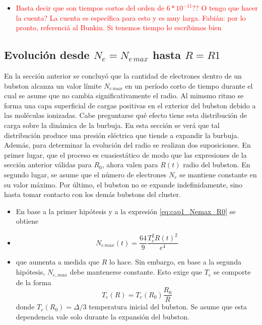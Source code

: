 \documentclass[aps,prb,twocolumn,superscriptaddress,floatfix,longbibliography,10pt]{revtex4-2}
\newif\ifptitle
\newif\ifpnumber
\newcounter{para}
\newcommand\ptitle[1]{\par\refstepcounter{para}
{\ifpnumber{\noindent\textcolor{lightgray}{\textbf{\thepara}}\indent}\fi}
{\ifptitle{\textbf{[{#1}]}}\fi}}
\begin{document}
\ptitle{Cálculo del tiempo al que se alcanza la densidad media máxima $t_0$??}
\begin{itemize}
  \item \textcolor{red}{Basta decir que son tiempos cortos del orden de $6*10^{-11}$?? O tengo que hacer la cuenta? La cuenta es específica para esto y es muy larga. Fabián: por lo pronto, referenciá al Bunkin. Si tenemos tiempo lo escribimos bien}
\end{itemize}



\subsection{Evolución desde $N_e = N_{e \, max}$ hasta $R = R1$}

En la sección anterior se concluyó que la cantidad de electrones dentro de un bubston alcanza un valor límite $N_{e \, max}$ en un período corto de tiempo durante el cual se asume que no cambia significativamente el radio. Al mimsmo ritmo se forma una capa superficial de cargas positivas en el exterior del bubston debido a las moléculas ionizadas. Cabe preguntarse qué efecto tiene esta distribución de carga sobre la dinámica de la burbuja. En esta sección se verá que tal distribución produce una presión eléctrica que tiende a expandir la burbuja. Además, para determinar la evolución del radio se realizan dos suposiciones. En primer lugar, que el proceso es cuasiestático de modo que las expresiones de la sección anterior válidas para $R_0$, ahora valen para $R(t)$ radio del bubston. En segundo lugar, se asume que el número de electrones $N_{e}$ se mantiene constante en su valor máximo. Por último, el bubston no se expande indefinidamente, sino hasta tomar contacto con los demás bubstons del cluster.


\ptitle{Consecuencias de las hipótesis: régimen de autoconsistencia}
\begin{itemize}
  \item En base a la primer hipótesis y a la expresión \ref{eq:cap1_Nemax_R0} se obtiene
  \item \[N_{e \, max}(t) = \frac{64}{9} \frac{T_e^2 R(t)^2}{e^4}\]
  \item que aumenta a medida que $R$ lo hace. Sin embargo, en base a la segunda hipótesis, $N_{e, max}$ debe mantenerse constante. Esto exige que $T_e$ se comporte de la forma
  \begin{equation}
    T_e(R) = T_e(R_0)\frac{R_0}{R}
    \label{eq:cap1_Te}
  \end{equation}
  donde $T_e(R_0) = \Delta/3$ temperatura inicial del bubston. Se asume que esta dependencia vale solo durante la expansión del bubston.
\end{itemize}
\end{document}
